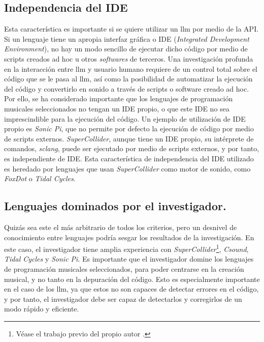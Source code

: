\subsection{Independencia del IDE}
Esta característica es importante si se quiere utilizar un \gls{llm} por medio de la API. Si un lenguaje tiene un apropia interfaz gráfica o IDE (\emph{Integrated Development Environment}), no hay un modo sencillo de ejecutar dicho código por medio de scripts creados ad hoc u otros \emph{softwares} de terceros. Una investigación profunda en la interacción entre \gls{llm} y usuario humano requiere de un control total sobre el código que se le pasa al \gls{llm}, así como la posibilidad de automatizar la ejecución del código y convertirlo en sonido a través de scripts o software creado ad hoc. Por ello, se ha considerado importante que los lenguajes de programación musicales seleccionados no tengan un IDE propio, o que este IDE no sea imprescindible para la ejecución del código. Un ejemplo de utilización de IDE propio es \emph{Sonic Pi}, que no permite por defecto la ejecución de código por medio de scripts externos. \emph{SuperCollider}, aunque tiene un IDE propio, su intérprete de comandos, \emph{sclang}, puede ser ejecutado por medio de scripts externos, y por tanto, es independiente de IDE. Esta característica de independencia del IDE utilizado es heredado por lenguajes que usan \emph{SuperCollider} como motor de sonido, como \emph{FoxDot} o \emph{Tidal Cycles}.

\subsection{Lenguajes dominados por el investigador.} 
Quizás sea este el más arbitrario de todos los criterios, pero un desnivel de conocimiento entre lenguajes podría sesgar los resultados de la investigación. En este caso, el investigador tiene amplia experiencia con \emph{SuperCollider}\footnote{Véase el trabajo previo del propio autor \citep{guerraparraMesjetiuTFM_Arte_Sonoro_MEMORIA2020}.}, \emph{Csound}, \emph{Tidal Cycles} y \emph{Sonic Pi}.
Es importante que el investigador domine los lenguajes de programación musicales seleccionados, para poder centrarse en la creación musical, y no tanto en la depuración del código. Esto es especialmente importante en el caso de los \gls{llm}, ya que estos no son capaces de detectar errores en el código, y por tanto, el investigador debe ser capaz de detectarlos y corregirlos de un modo rápido y eficiente.

